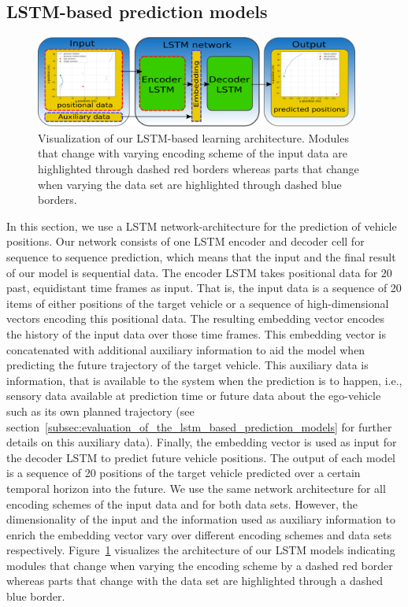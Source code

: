 \subsection{\acs{LSTM}-based prediction models}%
\label{subsec:lstm_based_prediction_models}

\begin{figure}[t!]
  \centering
  \includegraphics[width=0.95\textwidth]{imgs/lstm_arch.eps}
  \caption{Visualization of our \ac{LSTM}-based learning architecture. Modules that change with varying encoding scheme of the input data are highlighted through dashed red borders whereas parts that change when varying the data set are highlighted through dashed blue borders.}\label{fig:lstm_arch}
\end{figure}

In this section, we use a \acf{LSTM} \parencite{Hochreiter1997} network-architecture for the prediction of vehicle positions.
Our network consists of one \ac{LSTM} encoder and decoder cell for sequence to sequence prediction, which means that the input and the final result of our model is sequential data.
The encoder \ac{LSTM} takes positional data for $20$ past, equidistant time frames as input.
That is, the input data is a sequence of \num{20} items of either positions of the target vehicle or a sequence of high-dimensional vectors encoding this positional data.
The resulting embedding vector encodes the history of the input data over those time frames.
This embedding vector is concatenated with additional auxiliary information to aid the model when predicting the future trajectory of the target vehicle.
This auxiliary data is information, that is available to the system when the prediction is to happen, i.e., sensory data available at prediction time or future data about the ego-vehicle such as its own planned trajectory (see section~\ref{subsec:evaluation_of_the_lstm_based_prediction_models} for further details on this auxiliary data).
Finally, the embedding vector is used as input for the decoder \ac{LSTM} to predict future vehicle positions.
The output of each model is a sequence of \num{20} positions of the target vehicle predicted over a certain temporal horizon into the future.
We use the same network architecture for all encoding schemes of the input data and for both data sets.
However, the dimensionality of the input and the information used as auxiliary information to enrich the embedding vector vary over different encoding schemes and data sets respectively.
Figure~\ref{fig:lstm_arch} visualizes the architecture of our \ac{LSTM} models indicating modules that change when varying the encoding scheme by a dashed red border whereas parts that change with the data set are highlighted through a dashed blue border.

